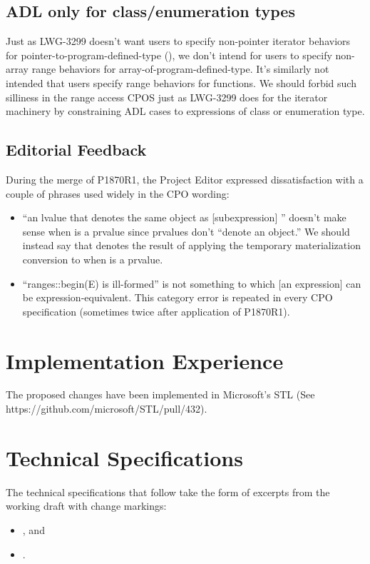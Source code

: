 \section{ADL only for class/enumeration types}

Just as LWG-3299 doesn't want users to specify non-pointer iterator behaviors
for pointer-to-program-defined-type (\cite{lwg3299}),
we don't intend for users to specify
non-array range behaviors for array-of-program-defined-type.
It's similarly not intended that users specify range behaviors for functions.
We should forbid such silliness in the range access CPOS
just as LWG-3299 does for the iterator machinery
by constraining ADL cases to expressions of class or enumeration type.


\section{Editorial Feedback}
During the merge of P1870R1, the Project Editor expressed dissatisfaction
with a couple of phrases used widely in the CPO wording:
\begin{itemize}
\item ``an lvalue  that denotes the same object as [subexpression] ''
  doesn't make sense when  is a prvalue since prvalues don't ``denote an object.''
  We should instead say that  denotes the result of applying
  the temporary materialization conversion to  when  is a prvalue.
\item ``ranges::begin(E) is ill-formed'' is not something
  to which [an expression] can be expression-equivalent.
  This category error is repeated in every CPO specification
  (sometimes twice after application of P1870R1).
\end{itemize}


\chapter{Implementation Experience}
The proposed changes have been implemented in Microsoft's STL (See https://github.com/microsoft/STL/pull/432).


\chapter{Technical Specifications}
The technical specifications that follow take the form of excerpts
from the working draft with change markings:
\begin{itemize}
\item {}, and
\item {}.
\end{itemize}


